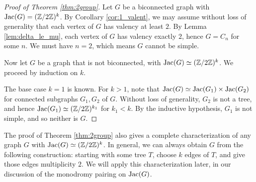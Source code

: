 \documentclass{amsart}
\begin{document}
\begin{proof}[Proof of Theorem \ref{thm:2group}]
  Let $G$ be a biconnected graph with $\operatorname{Jac}(G) = (\mathbb{Z}/2\mathbb{Z})^k$. By
  Corollary \ref{cor:1_valent}, we may assume without loss of
  generality that each vertex of $G$ has valency at least $2$. By
  Lemma \ref{lem:delta_le_mu}, each vertex of $G$ has valency exactly
  $2$, hence $G = C_n$ for some $n$. We must have $n=2$, which means $G$
  cannot be simple.

  Now let $G$ be a graph that is not biconnected, with $\operatorname{Jac}(G) \simeq
  (\mathbb{Z}/2\mathbb{Z})^k$. We proceed by induction on $k$.
  
  The base case $k=1$ is known. For $k > 1$, note that $\operatorname{Jac}(G) \simeq
  \operatorname{Jac}(G_1) \times \operatorname{Jac}(G_2)$ for connected subgraphs $G_1, G_2$ of
  $G$. Without loss of generality, $G_2$ is not a tree, and hence
  $\operatorname{Jac}(G_1) \simeq (\mathbb{Z}/2\mathbb{Z})^{k_1}$ for $k_1 < k$. By the inductive
  hypothesis, $G_1$ is not simple, and so neither is $G$.
\end{proof}

\begin{remark}
  The proof of Theorem \ref{thm:2group} also gives a complete
  characterization of any graph $G$ with $\operatorname{Jac}(G) \simeq
  (\mathbb{Z}/2\mathbb{Z})^k$. In general, we can always obtain $G$ from the following
  construction: starting with some tree $T$, choose $k$ edges of $T$,
  and give those edges multiplicity $2$. We will apply this
  characterization later, in our discussion of the monodromy pairing
  on $\operatorname{Jac}(G)$.
\end{remark}
\end{document}
